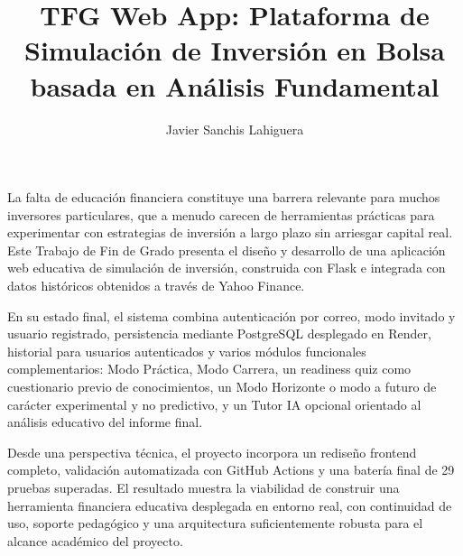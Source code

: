 \documentclass[twoside,spanish,a4paper,12pt]{tfg}
\title{TFG Web App: Plataforma de Simulación de Inversión en Bolsa basada en Análisis Fundamental}
\author{Javier Sanchis Lahiguera}
\begin{document}
\portada
\cleardoublepage
\contraportada
\cleardoublepage
\declaracion
\cleardoublepage

\cleardoublepage

\begin{resumen}
\setlength{\parskip}{1em}
La falta de educación financiera constituye una barrera relevante para muchos inversores particulares, que a menudo carecen de herramientas prácticas para experimentar con estrategias de inversión a largo plazo sin arriesgar capital real. Este Trabajo de Fin de Grado presenta el diseño y desarrollo de una aplicación web educativa de simulación de inversión, construida con Flask e integrada con datos históricos obtenidos a través de Yahoo Finance.

En su estado final, el sistema combina autenticación por correo, modo invitado y usuario registrado, persistencia mediante PostgreSQL desplegado en Render, historial para usuarios autenticados y varios módulos funcionales complementarios: Modo Práctica, Modo Carrera, un readiness quiz como cuestionario previo de conocimientos, un Modo Horizonte o modo a futuro de carácter experimental y no predictivo, y un Tutor IA opcional orientado al análisis educativo del informe final.

Desde una perspectiva técnica, el proyecto incorpora un rediseño frontend completo, validación automatizada con GitHub Actions y una batería final de 29 pruebas superadas. El resultado muestra la viabilidad de construir una herramienta financiera educativa desplegada en entorno real, con continuidad de uso, soporte pedagógico y una arquitectura suficientemente robusta para el alcance académico del proyecto.
\end{resumen}
\cleardoublepage
\end{document}
